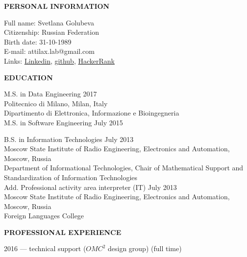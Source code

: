 \documentclass[a4paper,12pt,fullpage]{article}
\begin{document}
\begin{center}
	\textbf{PERSONAL INFORMATION\\}
\end{center}

Full name: \hfill Svetlana Golubeva\\
Citizenship: \hfill Russian Federation\\
Birth date: \hfill 31-10-1989\\
E-mail: \hfill attilax.lab@gmail.com \\
Links: \hfill  \href{}{Linkedin}, \href{https://github.com/attillax}{github}, 
\href{https://www.hackerrank.com/attillax}{HackerRank}\\

\begin{center}
	\textbf{EDUCATION}
\end{center}	

M.S. in Data Engineering \hfill 2017\\
Politecnico di Milano, Milan, Italy\\
Dipartimento di Elettronica, Informazione e Bioingegneria\\

M.S. in Software Engineering \hfill July 2015

B.S. in Information Technologies \hfill July 2013\\
Moscow State Institute of Radio Engineering, Electronics and Automation, Moscow,
 Russia\\
Department of Informational Technologies, Chair of Mathematical Support and 
Standardization of Information Technologies\\

Add. Professional activity area interpreter (IT) \hfill July 2013\\
Moscow State Institute of Radio Engineering, Electronics and Automation, Moscow,
 Russia\\
Foreign Languages College\\

\begin{center}
	\textbf{PROFESSIONAL EXPERIENCE}
\end{center}	
2016 --- technical support ($ OMC^{2} $ design group) (full time) \\
\end{document}
